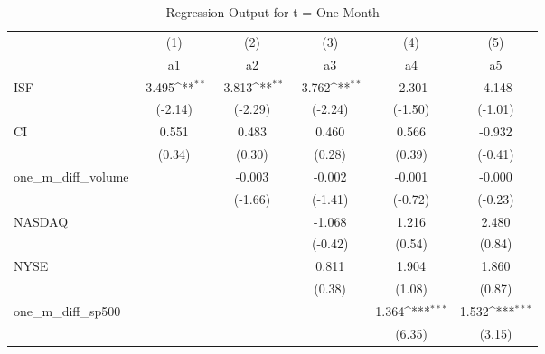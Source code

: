 \begin{table}[htbp]\centering
\def\sym#1{\ifmmode^{#1}\else\(^{#1}\)\fi}
\caption{Regression Output for t = One Month}
\begin{tabular}{l*{5}{c}}
\hline\hline
            &\multicolumn{1}{c}{(1)}         &\multicolumn{1}{c}{(2)}         &\multicolumn{1}{c}{(3)}         &\multicolumn{1}{c}{(4)}         &\multicolumn{1}{c}{(5)}         \\
            &          a1         &          a2         &          a3         &          a4         &          a5         \\
\hline
ISF         &      -3.495\sym{**} &      -3.813\sym{**} &      -3.762\sym{**} &      -2.301         &      -4.148         \\
            &     (-2.14)         &     (-2.29)         &     (-2.24)         &     (-1.50)         &     (-1.01)         \\
[1em]
CI          &       0.551         &       0.483         &       0.460         &       0.566         &      -0.932         \\
            &      (0.34)         &      (0.30)         &      (0.28)         &      (0.39)         &     (-0.41)         \\
[1em]
one\_m\_diff\_volume&                     &      -0.003         &      -0.002         &      -0.001         &      -0.000         \\
            &                     &     (-1.66)         &     (-1.41)         &     (-0.72)         &     (-0.23)         \\
[1em]
NASDAQ      &                     &                     &      -1.068         &       1.216         &       2.480         \\
            &                     &                     &     (-0.42)         &      (0.54)         &      (0.84)         \\
[1em]
NYSE        &                     &                     &       0.811         &       1.904         &       1.860         \\
            &                     &                     &      (0.38)         &      (1.08)         &      (0.87)         \\
[1em]
one\_m\_diff\_sp500&                     &                     &                     &       1.364\sym{***}&       1.532\sym{***}\\
            &                     &                     &                     &      (6.35)         &      (3.15)         \\

\end{tabular}
\end{table}
